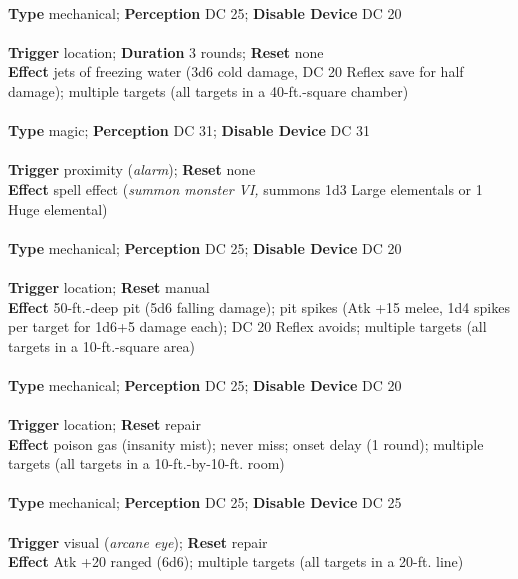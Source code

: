 \\
\textbf{Type }mechanical; \textbf{Perception} DC 25; \textbf{Disable Device} DC 20\\
\\
\textbf{Trigger} location; \textbf{Duration }3 rounds; \textbf{Reset} none\\
\textbf{Effect }jets of freezing water (3d6 cold damage, DC 20 Reflex save for half damage); multiple targets (all targets in a 40-ft.-square chamber)\\

\\
\textbf{Type }magic; \textbf{Perception} DC 31; \textbf{Disable Device} DC 31\\
\\
\textbf{Trigger} proximity (\textit{alarm}); \textbf{Reset} none\\
\textbf{Effect }spell effect (\textit{summon monster VI, }summons 1d3 Large elementals or 1 Huge elemental)\\

\\
\textbf{Type }mechanical; \textbf{Perception} DC 25; \textbf{Disable Device} DC 20\\
\\
\textbf{Trigger} location; \textbf{Reset} manual\\
\textbf{Effect }50-ft.-deep pit (5d6 falling damage); pit spikes (Atk +15 melee, 1d4 spikes per target for 1d6+5 damage each); DC 20 Reflex avoids; multiple targets (all targets in a 10-ft.-square area)\\

\\
\textbf{Type }mechanical; \textbf{Perception} DC 25; \textbf{Disable Device} DC 20\\
\\
\textbf{Trigger} location; \textbf{Reset} repair\\
\textbf{Effect }poison gas (insanity mist); never miss; onset delay (1 round); multiple targets (all targets in a 10-ft.-by-10-ft. room)\\

\\
\textbf{Type }mechanical; \textbf{Perception} DC 25; \textbf{Disable Device} DC 25\\
\\
\textbf{Trigger} visual (\textit{arcane eye}); \textbf{Reset} repair\\
\textbf{Effect }Atk +20 ranged (6d6); multiple targets (all targets in a 20-ft. line)\\

